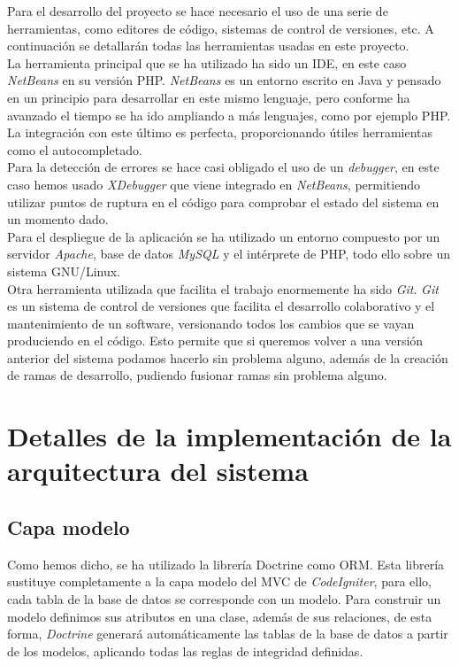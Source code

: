 Para el desarrollo del proyecto se hace necesario el uso de una serie de herramientas, como editores de código, sistemas de control de versiones, etc. A continuación se detallarán todas las herramientas usadas en este proyecto.\\

La herramienta principal que se ha utilizado ha sido un IDE, en este caso {\em NetBeans} en su versión PHP. {\em NetBeans} es un entorno escrito en Java y pensado en un principio para desarrollar en este mismo lenguaje, pero conforme ha avanzado el tiempo se ha ido ampliando a más lenguajes, como por ejemplo PHP. La integración con este último es perfecta, proporcionando útiles herramientas como el autocompletado.\\

Para la detección de errores se hace casi obligado el uso de un {\em debugger}, en este caso hemos usado {\em XDebugger} que viene integrado en {\em NetBeans}, permitiendo utilizar puntos de ruptura en el código para comprobar el estado del sistema en un momento dado.\\

Para el despliegue de la aplicación se ha utilizado un entorno compuesto por un servidor {\em Apache}, base de datos {\em MySQL} y el intérprete de PHP, todo ello sobre un sistema GNU/Linux.\\

Otra herramienta utilizada que facilita el trabajo enormemente ha sido {\em Git}. {\em Git} es un sistema de control de versiones que facilita el desarrollo colaborativo y el mantenimiento de un software, versionando todos los cambios que se vayan produciendo en el código. Esto permite que si queremos volver a una versión anterior del sistema podamos hacerlo sin problema alguno, además de la creación de ramas de desarrollo, pudiendo fusionar ramas sin problema alguno.\\

\section{Detalles de la implementación de la arquitectura del sistema}

\subsection{Capa modelo}

Como hemos dicho, se ha utilizado la librería Doctrine como ORM. Esta librería sustituye completamente a la capa modelo del MVC de {\em CodeIgniter}, para ello, cada tabla de la base de datos se corresponde con un modelo. Para construir un modelo definimos sus atributos en una clase, además de sus relaciones, de esta forma, {\em Doctrine} generará automáticamente las tablas de la base de datos a partir de los modelos, aplicando todas las reglas de integridad definidas.\\

